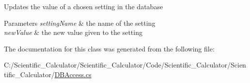Updates the value of a chosen setting in the database 


\begin{DoxyParams}{Parameters}
{\em setting\+Name} & the name of the setting\\
\hline
{\em new\+Value} & the new value given to the setting\\
\hline
\end{DoxyParams}


The documentation for this class was generated from the following file\+:\begin{DoxyCompactItemize}
\item 
C\+:/\+Scientific\+\_\+\+Calculator/\+Scientific\+\_\+\+Calculator/\+Code/\+Scientific\+\_\+\+Calculator/\+Scientific\+\_\+\+Calculator/\hyperlink{_d_b_access_8cs}{D\+B\+Access.\+cs}\end{DoxyCompactItemize}
